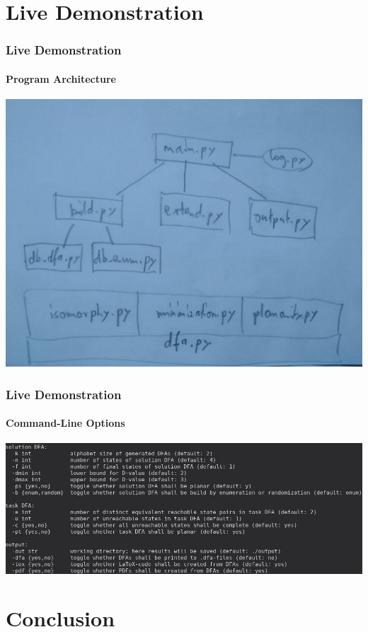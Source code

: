 \documentclass[handout,10pt]{beamer}%
\begin{document}
	\section{Live Demonstration}
	
	\begin{frame}
		\frametitle{Live Demonstration}
		\framesubtitle{Program Architecture}
		\centering
	    \includegraphics[width=0.9\linewidth]{prog_arch.jpg}
	
	\end{frame}

	\begin{frame}
		\frametitle{Live Demonstration}
		\framesubtitle{Command-Line Options}
		
		\includegraphics[width=\linewidth]{options.jpg}
	
	\end{frame}
	
	\section{Conclusion}
\end{document}
